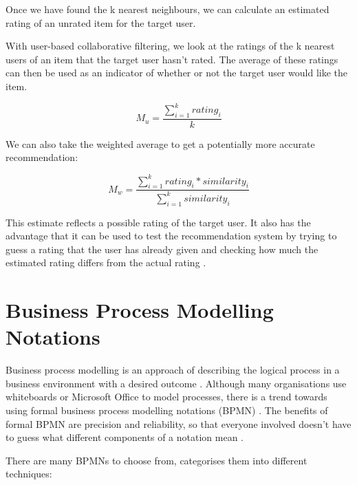 Once we have found the k nearest neighbours, we can calculate an estimated rating of an unrated item for the target user. 

With user-based collaborative filtering, we look at the ratings of the k nearest users of an item that the target user hasn't rated. The average of these ratings can then be used as an indicator of whether or not the target user would like the item.

\begin{equation}
M_{u} = \frac{\sum_{i=1}^{k}{rating_i}}{k}
\label{mean}
\end{equation}

We can also take the weighted average to get a potentially more accurate recommendation:

\begin{equation}
M_{w} = \frac{\sum_{i=1}^{k}{rating_i * similarity_i}}{\sum_{i=1}^{k}{similarity_i}}
\label{weightedMean}
\end{equation}


This estimate reflects a possible rating of the target user. It also has the advantage that it can be used to test the recommendation system by trying to guess a rating that the user has already given and checking how much the estimated rating differs from the actual rating \cite{miningOfMassiveDatasets}. 

\section{Business Process Modelling Notations}

\label{sec:background_bpmn}

Business process modelling is an approach of describing the logical process in a business environment with a desired outcome \cite{bpm_review_framework}. Although many organisations use whiteboards or Microsoft Office to model processes, there is a trend towards using formal business process modelling notations (BPMN) \cite{ebpma-tec-standards, bpm_review_framework}. The benefits of formal BPMN are precision and reliability, so that everyone involved doesn't have to guess what different components of a notation mean \cite{ebpma-tec-standards}.

There are many BPMNs to choose from, \cite{bpm_review_framework} categorises them into different techniques:

